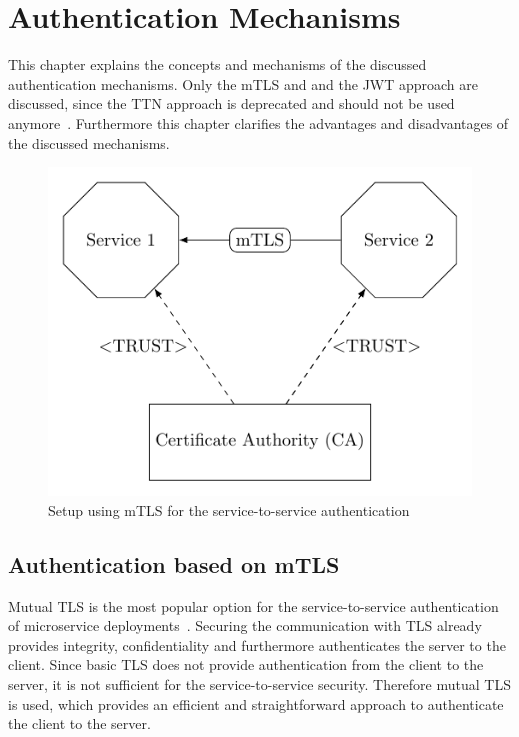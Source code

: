 \chapter{Authentication Mechanisms}
\label{cha:authentication_mechanisms}
This chapter explains the concepts and mechanisms of the discussed authentication mechanisms.
Only the mTLS and and the JWT approach are discussed, since the TTN approach is deprecated and should not be used anymore~\cite{dias2020microservices}.
Furthermore this chapter clarifies the advantages and disadvantages of the discussed mechanisms.

\begin{figure}
	\centering
	\includegraphics{images/authentication-mechanisms/TikZ_mTLS_base_structure.pdf}
	\caption{Setup using mTLS for the service-to-service authentication~\cite{dias2020microservices}}
	\label{fig:auth_mechanisms_mtls}
\end{figure}

\section{Authentication based on mTLS}
Mutual TLS is the most popular option for the service-to-service authentication of microservice deployments~\cite{dias2020microservices}.
Securing the communication with TLS already provides integrity, confidentiality and furthermore authenticates the server to the client.
Since basic TLS does not provide authentication from the client to the server, it is not sufficient for the service-to-service security.
Therefore mutual TLS is used, which provides an efficient and straightforward approach to authenticate the client to the server.

